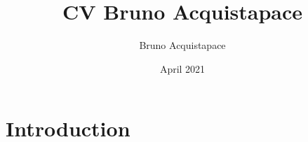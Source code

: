 \documentclass{article}
\title{CV Bruno Acquistapace}
\author{Bruno Acquistapace}
\date{April 2021}
\begin{document}
\maketitle

\section{Introduction}
\end{document}
